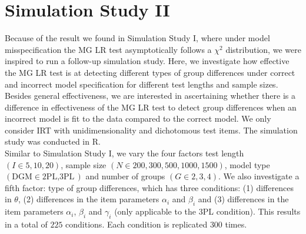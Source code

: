 \documentclass[Royal,sageapa,times,doublespace]{sagej}
\begin{document}
\section{\centering Simulation Study II}
Because of the result we found in Simulation Study I, where under model misspecification the MG LR test asymptotically follows a $\chi^2$ distribution, we were inspired to run a follow-up simulation study. Here, we investigate how effective the MG LR test is at detecting different types of group differences under correct and incorrect model specification for different test lengths and sample sizes. Besides general effectiveness, we are interested in ascertaining whether there is a difference in effectiveness of the MG LR test to detect group differences when an incorrect model is fit to the data compared to the correct model. We only consider IRT with unidimensionality and dichotomous test items. The simulation study was conducted in R. \\
\indent Similar to Simulation Study I, we vary the four factors test length $(I \in{5, 10, 20})$, sample size $(N \in{200, 300, 500, 1000, 1500})$, model type $(\text{DGM} \in{\text{2PL}, \text{3PL}})$ and number of groups $(G \in{2, 3, 4})$. We also investigate a fifth factor: type of group differences, which has three conditions: (1) differences in $\theta$, (2) differences in the item parameters $\alpha_i$ and $\beta_i$ and (3) differences in the item parameters $\alpha_i$, $\beta_i$ and $\gamma_i$ (only applicable to the 3PL condition). This results in a total of $225$ conditions. Each condition is replicated $300$ times. \\
\end{document}
